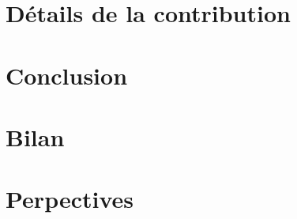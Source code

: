 \documentclass[french]{spimubphdthesis}
\begin{document}
\section{Détails de la contribution}

\section{Conclusion}
 
\section{Bilan}

\section{Perpectives}
 
\backmatter
 
 
 
 
 
 
 
 
 
%

\end{document}
